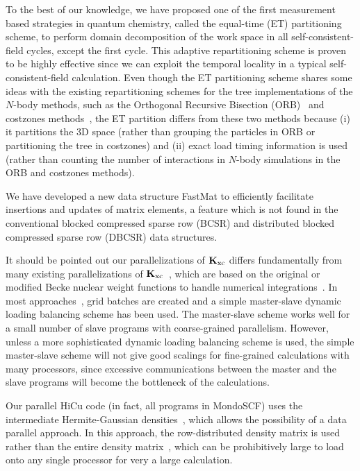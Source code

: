 \documentclass[preprint]{revtex4}
\newcommand{\Kxc}{{\bf K}_{\mathrm{xc}}}
\begin{document}
To the best of our knowledge, we have proposed one of the first
measurement based strategies in quantum chemistry, called the
equal-time (ET) partitioning scheme, to perform domain decomposition
of the work space in all self-consistent-field cycles, except the first cycle.
This adaptive repartitioning scheme is proven to be highly effective
since we can exploit the temporal locality in a typical
self-consistent-field calculation. Even though the ET partitioning
scheme shares some ideas with the existing repartitioning schemes
for the tree implementations of the $N$-body methods, 
such as the Orthogonal Recursive Bisection (ORB)~\cite{warren:92_article} 
and costzones methods~\cite{Singh93}, the ET partition
differs from these two methods because (i) it partitions the 3D space (rather than
grouping the particles in ORB or partitioning the tree in costzones)
and (ii) exact load timing information is used (rather than counting the
number of interactions in $N$-body simulations in the ORB and costzones methods).

We have developed a new data structure FastMat to efficiently
facilitate insertions and updates of matrix elements, a feature which
is not found in the conventional blocked compressed sparse row (BCSR)
and distributed blocked compressed sparse row (DBCSR) data structures.

It should be pointed out our parallelizations of $\Kxc$ differs
fundamentally from many existing parallelizations 
of $\Kxc$~\cite{Furlani_00v128,Yoshihiro_01v346}, which are
based on the original or modified Becke nuclear weight functions to
handle numerical integrations~\cite{Jorda95,Stratmann96,Scuseria99}. 
In most approaches~\cite{Furlani_00v128,Yoshihiro_01v346}, grid batches
are created and a simple master-slave dynamic loading balancing
scheme has been used. The master-slave scheme works 
well for a small number of slave programs
with coarse-grained parallelism.  However, unless a more sophisticated
dynamic loading balancing scheme is used, the simple master-slave scheme will not
give good scalings for fine-grained calculations with many processors,
since excessive communications between the master and the slave programs
will become the bottleneck of the calculations.

Our parallel HiCu code (in fact, all programs in MondoSCF) uses the intermediate 
Hermite-Gaussian densities~\cite{Ahmadi95,Challacombe_00v113}, which allows the
possibility of a data parallel approach. In this approach,
the row-distributed density matrix is used rather than the entire
density matrix~\cite{Furlani_00v128,Stratmann96,Sosa_00v26}, 
which can be prohibitively large to load onto any single processor
for very a large calculation.
\end{document}
